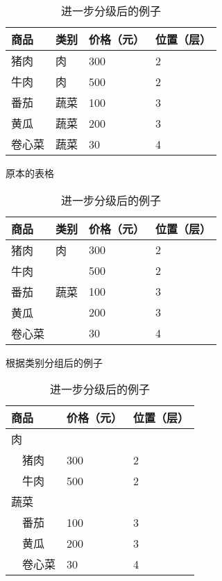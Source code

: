 \documentclass{article}
\begin{document}
\begin{table}[b]
    \begin{minipage}[t]{0.32\linewidth}
        \centering
        \begin{tabular}{@{}llll@{}} \toprule
            商品 & 类别 & 价格（元）& 位置（层） \\ \midrule
            猪肉  & 肉 & 300 & 2  \\ 
            牛肉  & 肉 & 500 & 2  \\ 
            番茄  & 蔬菜 & 100 & 3 \\ 
            黄瓜  & 蔬菜 & 200 & 3 \\ 
            卷心菜  & 蔬菜 & 30 & 4 \\ \bottomrule   
        \end{tabular}
        \caption{原本的表格}
        \label{tbl:row_hierarchy1}
    \end{minipage}
    \hfill
    \begin{minipage}[t]{0.32\linewidth}
        \centering
        \begin{tabular}{@{}llll@{}} \toprule
            商品 & 类别 & 价格（元）& 位置（层） \\ \midrule
            猪肉  & 肉 & 300 & 2  \\ 
            牛肉  &  & 500 & 2  \\ 
            番茄  & 蔬菜 & 100 & 3 \\ 
            黄瓜  &  & 200 & 3 \\ 
            卷心菜  & & 30 & 4 \\ \bottomrule   
        \end{tabular}
        \caption{根据类别分组后的例子}
        \label{tbl:row_hierarchy2}
    \end{minipage}
    \hfill
    \begin{minipage}[t]{0.32\linewidth}
        \centering
        \begin{tabular}{@{}lll@{}} \toprule
            商品 & 价格（元）& 位置（层） \\ \midrule
            肉       & & \\
            ~~猪肉     & 300 & 2  \\ 
            ~~牛肉     & 500 & 2  \\ 
            蔬菜     & & \\
            ~~番茄   & 100 & 3 \\ 
            ~~黄瓜 & 200 & 3 \\ 
            ~~卷心菜 & 30 & 4 \\ \bottomrule   
        \end{tabular}
        \caption{进一步分级后的例子}
        \label{tbl:row_hierarchy3}
    \end{minipage}
\end{table}
\end{document}
